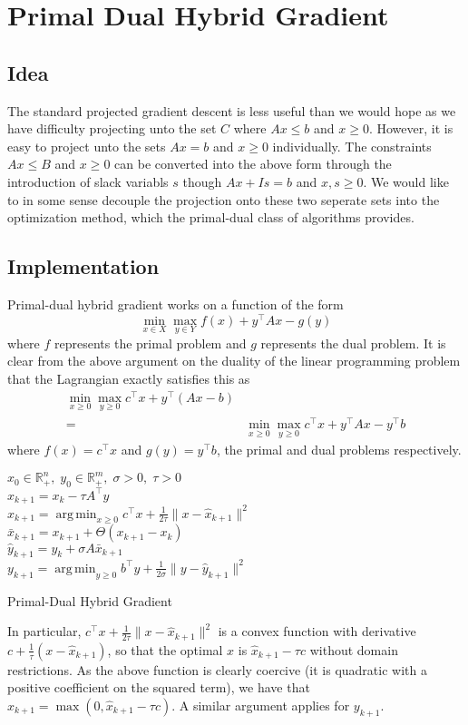 \documentclass[letterpaper,twocolumn,12pt]{article}
\DeclareMathOperator*{\argmin}{arg\,min}
\begin{document}
\section{Primal Dual Hybrid Gradient}
\subsection{Idea}
The standard projected gradient descent is less useful than we would hope as we have
difficulty projecting unto the set $C$ where $Ax\leq b$ and $x\geq 0$. However, it is easy to
project unto the sets $Ax=b$ and $x\geq 0$ individually. The constraints $Ax\leq B$ and
$x\geq 0$ can be converted into the above form through the introduction of slack variabls $s$
though $Ax+Is=b$ and $x,s\geq 0$. We would like to in some
sense decouple the projection onto these two seperate sets into the optimization method,
which the primal-dual class of algorithms provides.

\subsection{Implementation}
Primal-dual hybrid gradient works on a function of the form 
$$\min_{x\in X}\max_{y\in Y} f(x)+y^\intercal Ax-g(y)$$
where $f$ represents the primal problem and $g$ represents the dual problem. It is clear from
the above argument on the duality of the linear programming problem that the Lagrangian
exactly satisfies this as
\begin{align*}
  \min_{x\geq 0}\max_{y\geq 0} c^\intercal x+y^\intercal(Ax-b)\\
  =&\min_{x\geq 0}\max_{y\geq 0} c^\intercal x+y^\intercal Ax-y^\intercal b
\end{align*}
where $f(x)=c^\intercal x$ and $g(y)=y^\intercal b$, the primal and dual problems
respectively.

\begin{algorithm}
\SetAlgoLined
{}
  $x_0\in\mathbb{R}_+^n,\;y_0\in\mathbb{R}_+^m,\;\sigma>0,\;\tau>0$\\
  {
    $\hat{x}_{k+1}=x_k-\tau A^\intercal y$\\
    $x_{k+1}=\argmin_{x\geq 0} c^\intercal x+\frac{1}{2\tau}\|x-\hat{x}_{k+1}\|^2$\\
    $\bar{x}_{k+1}=x_{k+1}+\Theta(x_{k+1}-x_k)$\\
    $\hat{y}_{k+1}=y_k+\sigma A\bar{x}_{k+1}$\\
    $y_{k+1}=\argmin_{y\geq 0} b^\intercal y+\frac{1}{2\sigma}\|y-\hat{y}_{k+1}\|^2$
  }
  \caption{Primal-Dual Hybrid Gradient}
\end{algorithm}
In particular, $c^\intercal x+\frac{1}{2\tau}\|x-\hat{x}_{k+1}\|^2$ is
a convex function with derivative $c+\frac{1}{\tau}(x-\hat{x}_{k+1})$, so that the
optimal $x$ is $\hat{x}_{k+1}-\tau c$ without domain restrictions. As the above
function is clearly coercive (it is quadratic with a positive coefficient on the squared
term), we have that 
$x_{k+1}=\max(0,\hat{x}_{k+1}-\tau c)$.
A similar argument applies for $y_{k+1}$.
\end{document}
